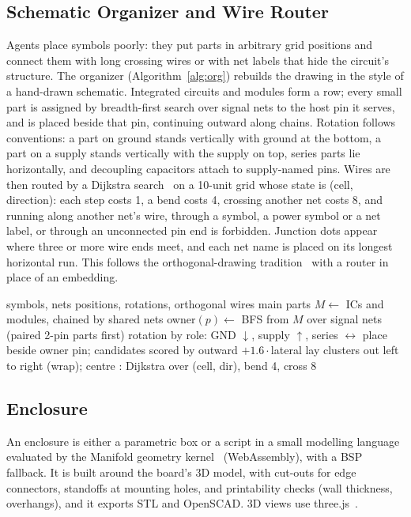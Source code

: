 \documentclass[journal]{IEEEtran}
\begin{document}
\subsection{Schematic Organizer and Wire Router}
Agents place symbols poorly: they put parts in arbitrary grid positions and connect them with long crossing wires or with net labels that hide the circuit's structure. The organizer (Algorithm~\ref{alg:org}) rebuilds the drawing in the style of a hand-drawn schematic. Integrated circuits and modules form a row; every small part is assigned by breadth-first search over signal nets to the host pin it serves, and is placed beside that pin, continuing outward along chains. Rotation follows conventions: a part on ground stands vertically with ground at the bottom, a part on a supply stands vertically with the supply on top, series parts lie horizontally, and decoupling capacitors attach to supply-named pins. Wires are then routed by a Dijkstra search~\cite{dijkstra1959} on a 10-unit grid whose state is (cell, direction): each step costs 1, a bend costs 4, crossing another net costs 8, and running along another net's wire, through a symbol, a power symbol or a net label, or through an unconnected pin end is forbidden. Junction dots appear where three or more wire ends meet, and each net name is placed on its longest horizontal run. This follows the orthogonal-drawing tradition~\cite{tamassia1987} with a router in place of an embedding.

\begin{algorithm}[t]
\caption{Schematic organizer}
\label{alg:org}
\small
\begin{algorithmic}[1]
\Require symbols, nets
\Ensure positions, rotations, orthogonal wires
\State main parts $M \gets$ ICs and modules, chained by shared nets
\State owner$(p) \gets$ BFS from $M$ over signal nets (paired 2-pin parts first)
  \State rotation by role: GND $\downarrow$, supply $\uparrow$, series $\leftrightarrow$
  \State place beside owner pin; candidates scored by outward $+1.6\cdot$lateral
\EndFor
\State lay clusters out left to right (wrap); centre
\State {}: Dijkstra over (cell, dir), bend 4, cross 8
\end{algorithmic}
\end{algorithm}

\subsection{Enclosure}
An enclosure is either a parametric box or a script in a small modelling language evaluated by the Manifold geometry kernel~\cite{manifold} (WebAssembly), with a BSP fallback. It is built around the board's 3D model, with cut-outs for edge connectors, standoffs at mounting holes, and printability checks (wall thickness, overhangs), and it exports STL and OpenSCAD. 3D views use three.js~\cite{threejs}.
\end{document}
